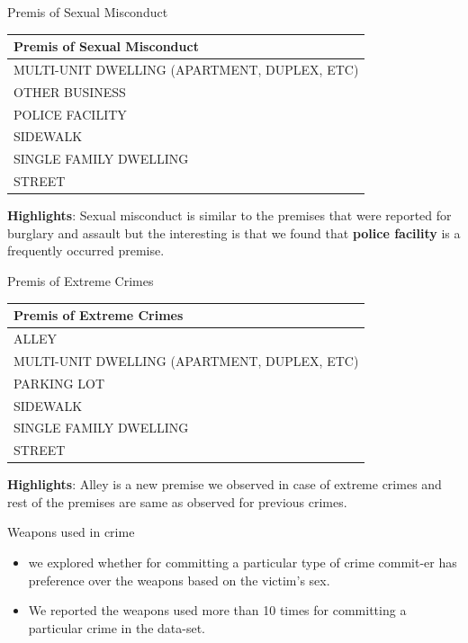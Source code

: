 \documentclass{beamer}\usepackage[]{graphicx}\usepackage[]{xcolor}
\newenvironment{knitrout}{}{} %
\begin{document}
\begin{frame}[fragile]{Premis of Sexual Misconduct}

\begin{knitrout}
\color{fgcolor}
\begin{tabular}{l}
\hline
Premis of Sexual Misconduct\\
\hline
MULTI-UNIT DWELLING (APARTMENT, DUPLEX, ETC)\\
\hline
OTHER BUSINESS\\
\hline
POLICE FACILITY\\
\hline
SIDEWALK\\
\hline
SINGLE FAMILY DWELLING\\
\hline
STREET\\
\hline
\end{tabular}

\end{knitrout}
\vspace{0.5cm}
\textbf{Highlights}: Sexual misconduct is similar to the premises that were reported for burglary and assault but the interesting is that we found that \textbf{police facility} is a frequently occurred premise.
\end{frame}


\begin{frame}[fragile]{Premis of Extreme Crimes}

\begin{knitrout}
\color{fgcolor}
\begin{tabular}{l}
\hline
Premis of Extreme Crimes\\
\hline
ALLEY\\
\hline
MULTI-UNIT DWELLING (APARTMENT, DUPLEX, ETC)\\
\hline
PARKING LOT\\
\hline
SIDEWALK\\
\hline
SINGLE FAMILY DWELLING\\
\hline
STREET\\
\hline
\end{tabular}

\end{knitrout}
\vspace{0.5cm}
\textbf{Highlights}: Alley is a new premise we observed in case of extreme crimes and rest of the premises are same as observed for previous crimes. 
\end{frame}


\begin{frame}[fragile]{Weapons used in crime}


\begin{itemize}
\item we explored whether for committing a particular type of crime commit-er has preference over the weapons based on the victim's sex.

\item We reported the weapons used more than 10 times for committing a particular crime in the data-set.
\end{itemize}


\end{frame}
\end{document}

